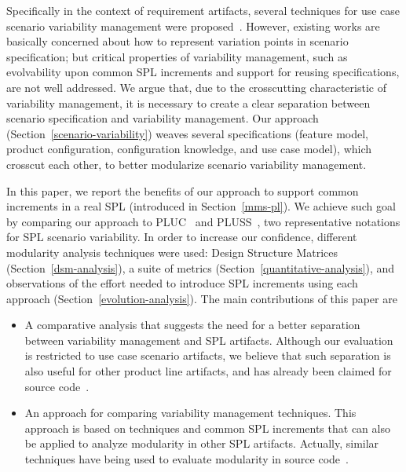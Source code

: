\documentclass{acm_proc_article-sp}
\begin{document}
Specifically in the context of requirement artifacts, several techniques for use case scenario variability management were proposed~\cite{favaro-icsr-98,bertolino-esec-2003,fantechi-splc-2004,eriksson-splc-2005}. However, existing works are basically concerned about how to represent variation points in scenario specification; but critical properties of variability management, such as evolvability upon common SPL increments and support for reusing specifications, are not well addressed. We argue that, due to the crosscutting characteristic of variability management, it is necessary to create a clear separation between scenario specification and variability management. Our approach (Section~\ref{scenario-variability}) weaves several specifications (feature model, product configuration, configuration knowledge, and use case model), which crosscut each other, to better modularize scenario variability management. 

In this paper, we report the benefits of our approach to support common increments in a real SPL (introduced in Section~\ref{mms-pl}). We achieve such goal by comparing our approach to PLUC~\cite{bertolino-esec-2003} and PLUSS~\cite{eriksson-splc-2005}, two representative notations for SPL scenario variability. In order to increase our confidence, different modularity analysis techniques were used: Design Structure Matrices (Section~\ref{dsm-analysis}), a suite of metrics (Section~\ref{quantitative-analysis}), and observations of the effort needed to introduce SPL increments using each approach (Section~\ref{evolution-analysis}). The main contributions of this paper are

\begin{itemize}
\item A comparative analysis that suggests the need for a better separation between variability management and SPL artifacts. Although our evaluation is restricted to use case scenario artifacts, we believe that such separation is also useful for other product line artifacts, and has already been claimed for source code~\cite{alves-gpce-06,mmedeiros-lawasp-2007}.

\item An approach for comparing variability management techniques. This approach is based on techniques and common SPL increments that can also be applied to analyze modularity in other SPL artifacts. Actually, similar techniques have being used to evaluate modularity in source code~\cite{vlopes-aosd-2005, sullivan-fse-2005,garcia-taosd-2005, greenwood-ecoop-2007}.   

\end{itemize}
\end{document}
